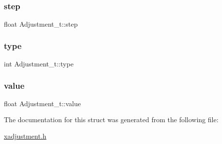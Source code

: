 \mbox{\label{structAdjustment__t_a0198d0a412f8642b3e8a308f9240d467}} 
\subsubsection{\texorpdfstring{step}{step}}
{\footnotesize\ttfamily float Adjustment\+\_\+t\+::step}

\mbox{\label{structAdjustment__t_a8d34edf1dfeaf75b7d22fb371c9c3b4a}} 
\subsubsection{\texorpdfstring{type}{type}}
{\footnotesize\ttfamily int Adjustment\+\_\+t\+::type}

\mbox{\label{structAdjustment__t_acb1f8fb06d9e505f9f50e9178256215c}} 
\subsubsection{\texorpdfstring{value}{value}}
{\footnotesize\ttfamily float Adjustment\+\_\+t\+::value}



The documentation for this struct was generated from the following file\+:\begin{DoxyCompactItemize}
\item 
\hyperlink{xadjustment_8h}{xadjustment.\+h}\end{DoxyCompactItemize}
